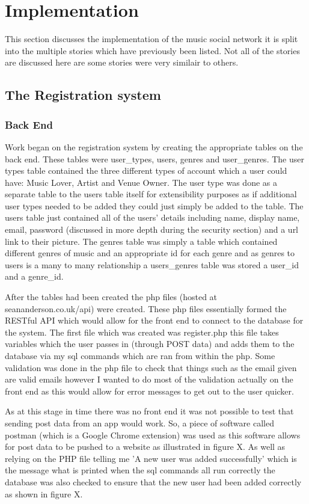 \chapter{Implementation}
This section discusses the implementation of the music social network it is split into the multiple stories which have previously been listed. Not all of the stories are discussed here are some stories were very similair to others.

\section{The Registration system}
\subsection{Back End}
Work began on the registration system by creating the appropriate tables on the back end. These tables were user\_types, users, genres and user\_genres. The user types table contained the three different types of account which a user could have: Music Lover, Artist and Venue Owner. The user type was done as a separate table to the users table itself for extensibility purposes as if additional user types needed to be added they could just simply be added to the table. The users table just contained all of the users' details including name, display name, email, password (discussed in more depth during the security section) and a url link to their picture. The genres table was simply a table which contained different genres of music and an appropriate id for each genre and as genres to users is a many to many relationship a users\_genres table was stored a user\_id and a genre\_id.

After the tables had been created the php files (hosted at seananderson.co.uk/api) were created. These php files essentially formed the RESTful API which would allow for the front end to connect to the database for the system. The first file which was created was register.php this file takes variables which the user passes in (through POST data) and adds them to the database via my sql commands which are ran from within the php. Some validation was done in the php file to check that things such as the email given are valid emails however I wanted to do most of the validation actually on the front end as this would allow for error messages to get out to the user quicker. 

As at this stage in time there was no front end it was not possible to test that sending post data from an app would work. So, a piece of software called postman (which is a Google Chrome extension) was used as this software allows for post data to be pushed to a website as illustrated in figure X. As well as relying on the PHP file telling me 'A new user was added successfully' which is the message what is printed when the sql commands all run correctly the database was also checked to ensure that the new user had been added correctly as shown in figure X.


